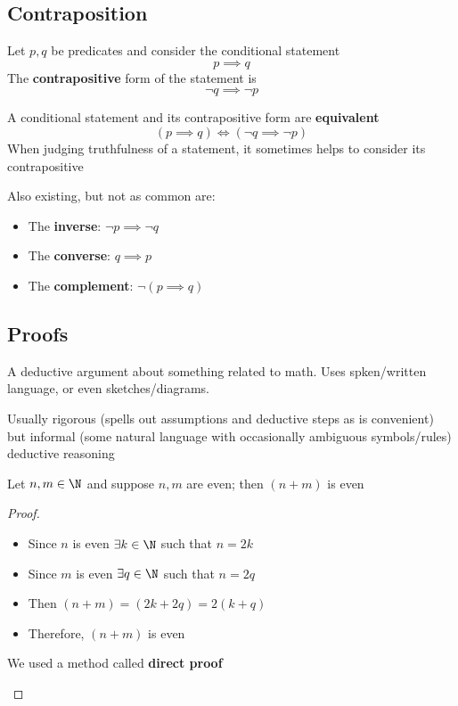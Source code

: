 \subsection{Contraposition}
\begin{definition*}[Contraposition]\label{def:contraposition}
    
    Let $p,q$ be predicates and consider the conditional statement
    \[
    p \implies q
    \]
    The \textbf{contrapositive} form of the statement is
    \[
    \neg q \implies \neg p
    \]

    A conditional statement and its contrapositive form are \textbf{equivalent}
    \[
    (p \implies q) \iff (\neg q \implies \neg p)
    \]
    When judging truthfulness of a statement, it sometimes helps to consider its contrapositive
\end{definition*}
Also existing, but not as common are:
\begin{itemize}
    \item The \textbf{inverse}: $\neg p \implies \neg q$
    \item The \textbf{converse}: $q \implies p$
    \item The \textbf{complement}: $\neg(p \implies q)$
\end{itemize}

\subsection{Proofs}

\begin{definition*}\label{def:proof}
    A deductive argument about something related to math. Uses spken/written language, or even sketches/diagrams.

    Usually rigorous (spells out assumptions and deductive steps as is convenient) but informal (some natural language with occasionally ambiguous symbols/rules) deductive reasoning
\end{definition*}
\begin{proposition}
    Let $n,m \in \N$ and suppose $n,m$ are even; then $(n+m)$ is even
\end{proposition}
\begin{proof}\ 
\begin{itemize}
    \item Since $n$ is even $\exists k \in \N$ such that $n=2k$
    \item Since $m$ is even $\exists q \in \N$ such that $n=2q$
    \item Then $(n+m)=(2k+2q)=2(k+q)$
    \item Therefore, $(n+m)$ is even
\end{itemize}
\begin{note}
    We used a method called \textbf{direct proof}
\end{note}
\end{proof}
